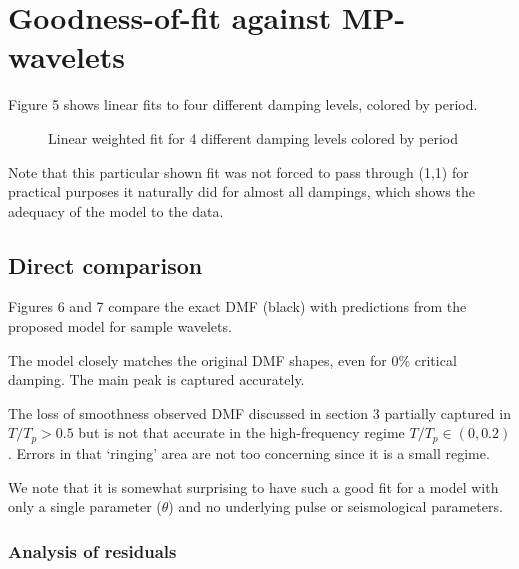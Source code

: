\section{Goodness-of-fit against
MP-wavelets}\label{goodness-of-fit-against-mp-wavelets}

Figure 5 shows linear fits to four different damping levels, colored by
period.

\begin{figure}
\centering
{}
\caption{Linear weighted fit for 4 different damping levels colored by
period}
\end{figure}

Note that this particular shown fit was not forced to pass through (1,1)
for practical purposes it naturally did for almost all dampings, which
shows the adequacy of the model to the data.

\subsection{Direct comparison}\label{direct-comparison}

Figures 6 and 7 compare the exact DMF (black) with predictions from the
proposed model for sample wavelets.


The model closely matches the original DMF shapes, even for 0\% critical
damping. The main peak is captured accurately.

The loss of smoothness observed DMF discussed in section 3 partially
captured in \(T/T_p > 0.5\) but is not that accurate in the
high-frequency regime \(T/T_p \in (0,0.2)\). Errors in that `ringing'
area are not too concerning since it is a small regime.

We note that it is somewhat surprising to have such a good fit for a
model with only a single parameter (\(\theta\)) and no underlying pulse
or seismological parameters.

\subsubsection{Analysis of residuals}\label{analysis-of-residuals}

